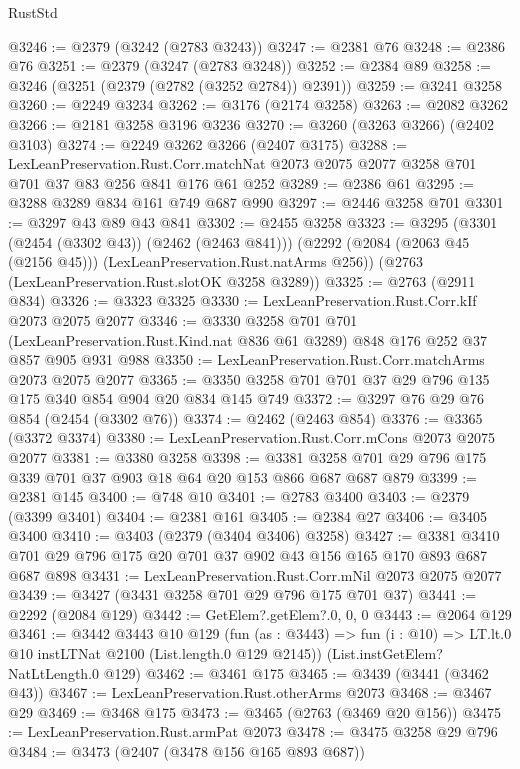 \begin{lexlean}{RustStd}
\begin{coremodule}
@3246 := @2379 (@3242 (@2783 @3243))
@3247 := @2381 @76
@3248 := @2386 @76
@3251 := @2379 (@3247 (@2783 @3248))
@3252 := @2384 @89
@3258 := @3246 (@3251 (@2379 (@2782 (@3252 @2784)) @2391))
@3259 := @3241 @3258
@3260 := @2249 @3234
@3262 := @3176 (@2174 @3258)
@3263 := @2082 @3262
@3266 := @2181 @3258 @3196 @3236
@3270 := @3260 (@3263 @3266) (@2402 @3103)
@3274 := @2249 @3262 @3266 (@2407 @3175)
@3288 := LexLeanPreservation.Rust.Corr.matchNat
    @2073
    @2075
    @2077
    @3258
    @701
    @701
    @37
    @83
    @256
    @841
    @176
    @61
    @252
@3289 := @2386 @61
@3295 := @3288 @3289 @834 @161 @749 @687 @990
@3297 := @2446 @3258 @701
@3301 := @3297 @43 @89 @43 @841
@3302 := @2455 @3258
@3323 := @3295
    (@3301 (@2454 (@3302 @43)) (@2462 (@2463 @841)))
    (@2292 (@2084 (@2063 @45 (@2156 @45))) (LexLeanPreservation.Rust.natArms @256))
    (@2763 (LexLeanPreservation.Rust.slotOK @3258 @3289))
@3325 := @2763 (@2911 @834)
@3326 := @3323 @3325
@3330 := LexLeanPreservation.Rust.Corr.kIf @2073 @2075 @2077
@3346 := @3330
    @3258
    @701
    @701
    (LexLeanPreservation.Rust.Kind.nat @836 @61 @3289)
    @848
    @176
    @252
    @37
    @857
    @905
    @931
    @988
@3350 := LexLeanPreservation.Rust.Corr.matchArms @2073 @2075 @2077
@3365 := @3350 @3258 @701 @701 @37 @29 @796 @135 @175 @340 @854 @904 @20 @834 @145 @749
@3372 := @3297 @76 @29 @76 @854 (@2454 (@3302 @76))
@3374 := @2462 (@2463 @854)
@3376 := @3365 (@3372 @3374)
@3380 := LexLeanPreservation.Rust.Corr.mCons @2073 @2075 @2077
@3381 := @3380 @3258
@3398 := @3381 @3258 @701 @29 @796 @175 @339 @701 @37 @903 @18 @64 @20 @153 @866 @687 @687 @879
@3399 := @2381 @145
@3400 := @748 @10
@3401 := @2783 @3400
@3403 := @2379 (@3399 @3401)
@3404 := @2381 @161
@3405 := @2384 @27
@3406 := @3405 @3400
@3410 := @3403 (@2379 (@3404 @3406) @3258)
@3427 := @3381 @3410 @701 @29 @796 @175 @20 @701 @37 @902 @43 @156 @165 @170 @893 @687 @687 @898
@3431 := LexLeanPreservation.Rust.Corr.mNil @2073 @2075 @2077
@3439 := @3427 (@3431 @3258 @701 @29 @796 @175 @701 @37)
@3441 := @2292 (@2084 @129)
@3442 := GetElem?.getElem?.{0, 0, 0}
@3443 := @2064 @129
@3461 := @3442
    @3443
    @10
    @129
    (fun (as : @3443) =>
    fun (i : @10) => LT.lt.{0} @10 instLTNat @2100 (List.length.{0} @129 @2145))
    (List.instGetElem?NatLtLength.{0} @129)
@3462 := @3461 @175
@3465 := @3439 (@3441 (@3462 @43))
@3467 := LexLeanPreservation.Rust.otherArms @2073
@3468 := @3467 @29
@3469 := @3468 @175
@3473 := @3465 (@2763 (@3469 @20 @156))
@3475 := LexLeanPreservation.Rust.armPat @2073
@3478 := @3475 @3258 @29 @796
@3484 := @3473 (@2407 (@3478 @156 @165 @893 @687))

\end{coremodule}
\end{lexlean}
